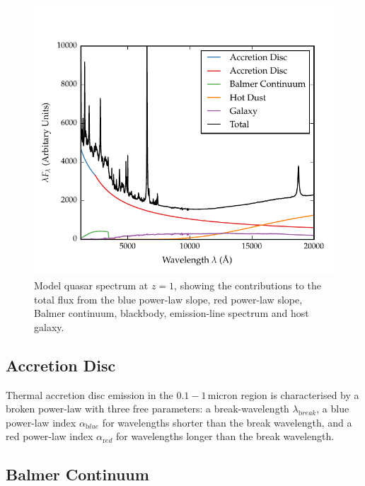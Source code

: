 \begin{figure}[h!]
  \centering
  \includegraphics[width=\textwidth]{figures/chapter05/sed_model.pdf}
  \caption[{Model quasar spectrum at $z=1$, showing the contributions to the total flux from the blue power-law slope, red power-law slope, Balmer continuum, blackbody, emission-line spectrum and host galaxy.}]{Model quasar spectrum at $z=1$, showing the contributions to the total flux from the blue power-law slope, red power-law slope, Balmer continuum, blackbody, emission-line spectrum and host galaxy. }
  \label{fig:modelsed}
\end{figure}


\subsection{Accretion Disc}

Thermal accretion disc emission in the $0.1 - 1$\,micron region is characterised by a broken power-law with three free parameters: a break-wavelength $\lambda_{\mathrm break}$, a blue power-law index $\alpha_{\mathrm blue}$ for wavelengths shorter than the break wavelength, and a red power-law index $\alpha_{\mathrm red}$ for wavelengths longer than the break wavelength.

\subsection{Balmer Continuum}

